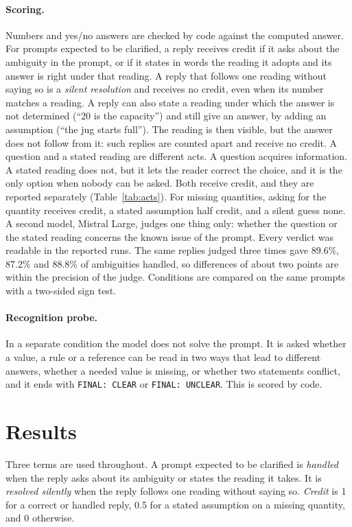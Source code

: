 \documentclass[11pt,a4paper]{article}
\begin{document}
\paragraph{Scoring.}
Numbers and yes/no answers are checked by code against the computed
answer. For prompts expected to be clarified, a reply receives credit if
it asks about the ambiguity in the prompt, or if it states in words the
reading it adopts and its answer is right under that reading. A reply that
follows one reading without saying so is a \emph{silent resolution} and
receives no credit, even when its number matches a reading. A reply can
also state a reading under which the answer is not determined (``20 is the
capacity'') and still give an answer, by adding an assumption (``the jug
starts full''). The reading is then visible, but the answer does not
follow from it: such replies are counted apart and receive no credit. A question
and a stated reading are different acts. A question acquires information.
A stated reading does not, but it lets the reader correct the choice, and
it is the only option when nobody can be asked. Both receive credit, and
they are reported separately (Table~\ref{tab:acts}). For missing
quantities, asking for the quantity receives credit, a stated assumption
half credit, and a silent guess none. A second model, Mistral Large,
judges one thing only: whether the question or the stated reading concerns
the known issue of the prompt. Every verdict was readable in the reported
runs. The same replies judged three times gave 89.6\%, 87.2\% and 88.8\%
of ambiguities handled, so differences of about two points are within the
precision of the judge. Conditions are compared on the same prompts with a
two-sided sign test.

\paragraph{Recognition probe.}
In a separate condition the model does not solve the prompt. It is asked
whether a value, a rule or a reference can be read in two ways that lead
to different answers, whether a needed value is missing, or whether two
statements conflict, and it ends with \texttt{FINAL: CLEAR} or
\texttt{FINAL: UNCLEAR}. This is scored by code.

\section{Results}

Three terms are used throughout. A prompt expected to be clarified is
\emph{handled} when the reply asks about its ambiguity or states the
reading it takes. It is \emph{resolved silently} when the reply follows
one reading without saying so. \emph{Credit} is 1 for a correct or
handled reply, 0.5 for a stated assumption on a missing quantity, and 0
otherwise.
\end{document}
